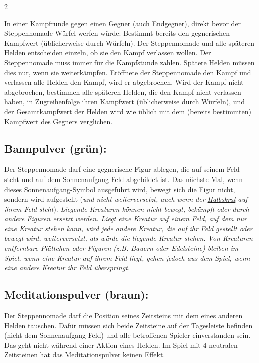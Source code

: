 \documentclass[10pt, a4paper, oneside]{book}
\newcommand{\fan}[1]{\textit{#1}}
\begin{document}
\begin{multicols*}{2}
\begin{nobgcolor}
In einer Kampfrunde gegen einen Gegner (auch Endgegner\supercite{90008}), direkt bevor der Steppennomade Würfel werfen würde: Bestimmt bereits den gegnerischen Kampfwert (üblicherweise durch Würfeln).
\supercite{MH:Pulver}
Der Steppennomade und alle späteren Helden entscheiden einzeln, ob sie den Kampf verlassen wollen. Der Steppennomade muss immer für die Kampfstunde zahlen. Spätere Helden müssen dies nur, wenn sie weiterkämpfen. Eröffnete der Steppennomade den Kampf und verlassen alle Helden den Kampf, wird er abgebrochen. Wird der Kampf nicht abgebrochen, bestimmen alle späteren Helden, die den Kampf nicht verlassen haben, in Zugreihenfolge ihren Kampfwert (üblicherweise durch Würfeln), und der Gesamtkampfwert der Helden wird wie üblich mit dem (bereits bestimmten) Kampfwert des Gegners verglichen.
\supercite{89624,89625,90058}




\subsection{Bannpulver (grün):}

Der Steppennomade darf eine gegnerische Figur ablegen, die auf seinem Feld steht und auf dem Sonnenaufgang-Feld abgebildet ist\supercite{90058}. Das nächste Mal, wenn dieses Sonnenaufgang-Symbol ausgeführt wird, bewegt sich die Figur nicht, sondern wird aufgestellt\supercite{MH:Pulver} (\fan{und nicht weiterversetzt, auch wenn der \hyperref[Halbskral]{Halbskral} auf ihrem Feld steht}).
\fan{Liegende Kreaturen können nicht bewegt, bekämpft oder durch andere Figuren ersetzt werden. Liegt eine Kreatur auf einem Feld, auf dem nur eine Kreatur stehen kann, wird jede andere Kreatur, die auf ihr Feld gestellt oder bewegt wird, weiterversetzt, als würde die liegende Kreatur stehen. Von Kreaturen entfernbare Plättchen oder Figuren (z.B. Bauern oder Edelsteine) bleiben im Spiel, wenn eine Kreatur auf ihrem Feld liegt, gehen jedoch aus dem Spiel, wenn eine andere Kreatur ihr Feld überspringt.}





\subsection{Meditationspulver (braun):}

Der Steppennomade darf die Position seines Zeitsteins mit dem eines anderen Helden tauschen. Dafür müssen sich beide Zeitsteine auf der Tagesleiste befinden (nicht dem Sonnenaufgang-Feld\supercite{MH:Begleitheft}) und alle betroffenen Spieler einverstanden sein.
\supercite{MH:Pulver}
Das geht nicht während einer Aktion eines Helden.
\supercite{88552}
Im Spiel mit 4 neutralen Zeitsteinen hat das Meditationspulver keinen Effekt.



\end{nobgcolor}
\end{multicols*}
\end{document}

